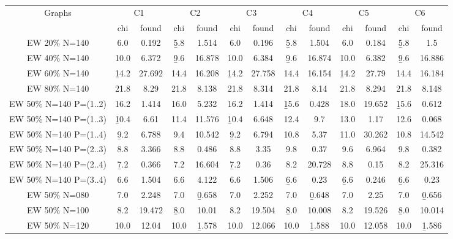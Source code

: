 \begin{sidewaystable}
\label{table:pdsatur:hardp}
\centering

\begin{tabular}{|c|cc|cc|cc|cc|cc|cc|}
\hline
\multicolumn{1}{|c|}{Graphs} & \multicolumn{2}{|c|}{C1} & \multicolumn{2}{|c|}{C2} & \multicolumn{2}{|c|}{C3} & \multicolumn{2}{|c|}{C4} & \multicolumn{2}{|c|}{C5} & \multicolumn{2}{|c|}{C6}
\\
 & chi & found & chi & found & chi & found & chi & found & chi & found & chi & found
\\
\hline
EW 20\% N=140 &  6.0 & 0.192 &  \b{5.8} & 1.514 &  6.0 & 0.196 &  \b{5.8} & 1.504 &  6.0 & 0.184 &  \b{5.8} &  1.5
\\
EW 40\% N=140 & 10.0 & 6.372 &  \b{9.6} & 16.878 & 10.0 & 6.384 &  \b{9.6} & 16.874 & 10.0 & 6.382 &  \b{9.6} & 16.886
\\
EW 60\% N=140 & \b{14.2} & 27.692 & 14.4 & 16.208 & \b{14.2} & 27.758 & 14.4 & 16.154 & \b{14.2} & 27.79 & 14.4 & 16.184
\\
EW 80\% N=140 & 21.8 & 8.29 & 21.8 & 8.138 & 21.8 & 8.314 & 21.8 & 8.14 & 21.8 & 8.294 & 21.8 & 8.148
\\
\hline
EW 50\% N=140 P=(1..2) & 16.2 & 1.414 & 16.0 & 5.232 & 16.2 & 1.414 & \b{15.6} & 0.428 & 18.0 & 19.652 & \b{15.6} & 0.612
\\
EW 50\% N=140 P=(1..3) & \b{10.4} & 6.61 & 11.4 & 11.576 & \b{10.4} & 6.648 & 12.4 &  9.7 & 13.0 & 1.17 & 12.6 & 0.068
\\
EW 50\% N=140 P=(1..4) &  \b{9.2} & 6.788 &  9.4 & 10.542 &  \b{9.2} & 6.794 & 10.8 & 5.37 & 11.0 & 30.262 & 10.8 & 14.542
\\
EW 50\% N=140 P=(2..3) &  8.8 & 3.366 &  8.8 & 0.486 &  8.8 & 3.35 &  9.8 & 0.37 &  9.6 & 6.964 &  9.8 & 0.382
\\
EW 50\% N=140 P=(2..4) &  \b{7.2} & 0.366 &  7.2 & 16.604 &  \b{7.2} & 0.36 &  8.2 & 20.728 &  8.8 & 0.15 &  8.2 & 25.316
\\
EW 50\% N=140 P=(3..4) &  6.6 & 1.504 &  6.6 & 4.122 &  6.6 & 1.506 &  \b{6.6} & 0.23 &  \b{6.6} & 0.246 &  \b{6.6} & 0.23
\\
\hline
EW 50\% N=080 &  7.0 & 2.248 &  7.0 & \b{0.658} &  7.0 & 2.252 &  7.0 & \b{0.648} &  7.0 & 2.25 &  7.0 & \b{0.656}
\\
EW 50\% N=100 &  8.2 & 19.472 &  \b{8.0} & 10.01 &  8.2 & 19.504 &  \b{8.0} & 10.008 &  8.2 & 19.526 &  \b{8.0} & 10.014
\\
EW 50\% N=120 & 10.0 & 12.04 & 10.0 & \b{1.578} & 10.0 & 12.066 & 10.0 & \b{1.588} & 10.0 & 12.058 & 10.0 & \b{1.586}

\end{tabular}
\end{sidewaystable}
